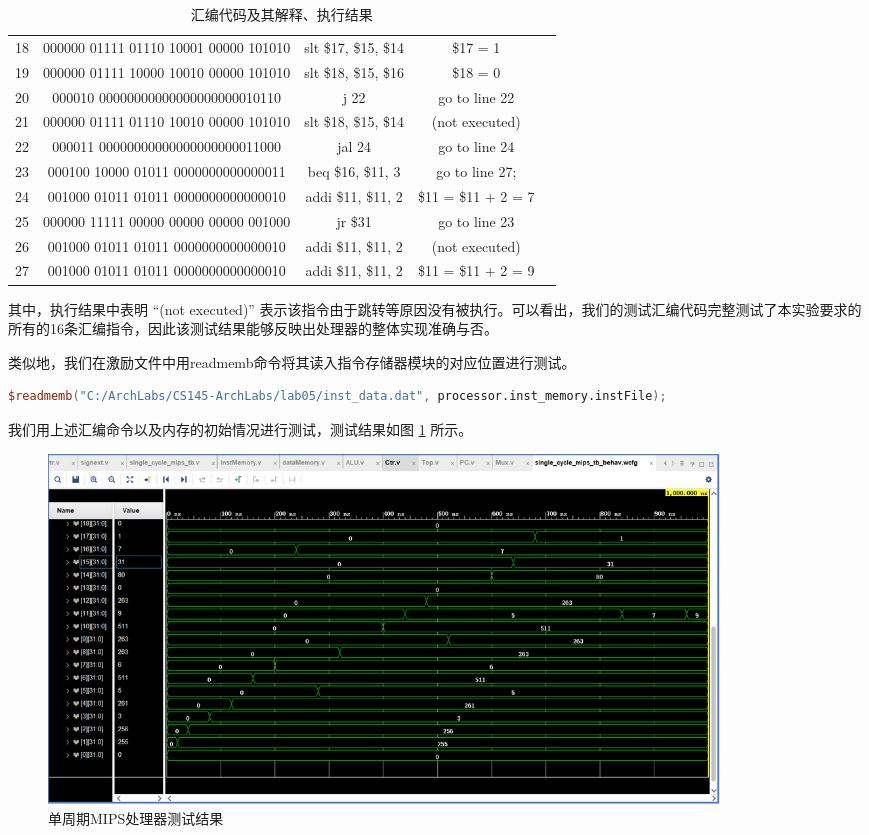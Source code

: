 \documentclass{cumcm}
\numberwithin{equation}{section}
\numberwithin{equation}{subsection}
\begin{document}
\begin{table}[htbp]
\begin{tabular}{|c|c|c|c|c|}
        18 & 000000 01111 01110 10001 00000 101010 & slt \$17, \$15, \$14 & \$17 = 1\\
        19 & 000000 01111 10000 10010 00000 101010 & slt \$18, \$15, \$16 & \$18 = 0\\
        20 & 000010 00000000000000000000010110 & j 22 & go to line 22\\
        21 & 000000 01111 01110 10010 00000 101010 & slt \$18, \$15, \$14 & (not executed) \\
        22 & 000011 00000000000000000000011000 & jal 24 & go to line 24\\
        23 & 000100 10000 01011 0000000000000011 & beq \$16, \$11, 3 & go to line 27;\\
        24 & 001000 01011 01011 0000000000000010 & addi \$11, \$11, 2 & \$11 = \$11 + 2 = 7\\
        25 & 000000 11111 00000 00000 00000 001000 & jr \$31 & go to line 23\\
        26 & 001000 01011 01011 0000000000000010 & addi \$11, \$11, 2 & (not executed)\\
        27 & 001000 01011 01011 0000000000000010 & addi \$11, \$11, 2 & \$11 = \$11 + 2 = 9\\
        \hline
    \end{tabular}
    \caption{汇编代码及其解释、执行结果}
    \label{tab6}
\end{table}

其中，执行结果中表明 “(not executed)” 表示该指令由于跳转等原因没有被执行。可以看出，我们的测试汇编代码完整测试了本实验要求的所有的16条汇编指令，因此该测试结果能够反映出处理器的整体实现准确与否。

类似地，我们在激励文件中用readmemb命令将其读入指令存储器模块的对应位置进行测试。
\begin{lstlisting}[language=verilog]
$readmemb("C:/ArchLabs/CS145-ArchLabs/lab05/inst_data.dat", processor.inst_memory.instFile);
\end{lstlisting}

\clearpage

我们用上述汇编命令以及内存的初始情况进行测试，测试结果如图 \ref{fig2} 所示。

\begin{figure}[htbp]
    \centering
    \includegraphics[width=7in]{1.png}
    \caption{单周期MIPS处理器测试结果}
    \label{fig2}
\end{figure}
\end{document}
